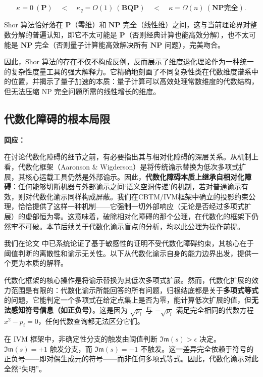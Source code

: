 \documentclass{ctexart}
\begin{document}
	\[
	\kappa = 0 \ (\mathbf{P}) \quad < \quad \kappa_q = O(1) \ (\mathbf{BQP}) \quad < \quad \kappa = \Omega(n) \ (\mathbf{NP}\text{完全}).
	\]
	
	Shor 算法恰好落在 $\mathbf{P}$（零维）和 $\mathbf{NP}$ 完全（线性维）之间，这与当前理论界对整数分解的普遍认知，即它不太可能是 $\mathbf{P}$（否则经典计算也能高效分解），也不太可能是 $\mathbf{NP}$ 完全（否则量子计算能高效解决所有 $\mathbf{NP}$ 问题），完美吻合。
	
	因此，Shor 算法的存在不仅不构成反例，反而展示了维度退化理论作为一种统一的复杂性度量工具的强大解释力。它精确地刻画了不同复杂性类在代数维度谱系中的位置，并揭示了量子加速的本质：量子计算可以高效处理常数维度的代数结构，但无法压缩 NP 完全问题所需的线性增长的维度。
	
	
	\subsection{代数化障碍的根本局限}
	
	\textbf{回应：} 
	
	在讨论代数化障碍的细节之前，有必要指出其与相对化障碍的深层关系。从机制上看，代数化框架（Aaronson \& Wigderson）是将传统谕示替换为低次多项式扩展，其核心运载工具仍然是外部谕示。因此，\textbf{代数化障碍本质上继承自相对化障碍}：任何能够切断机器与外部谕示之间‘语义空洞传递’的机制，若对普通谕示有效，则对代数化谕示同样构成屏蔽。我们在CBTM/IVM框架中确立的投影约束公理，恰恰提供了这样一种机制——它强制一切外部响应（无论是否经过多项式扩展）的虚部恒为零。这意味着，破除相对化障碍的那个公理，在代数化的框架下仍然牢不可破。本节后续关于代数化谕示盲点的分析，均以此公理为操作前提。
	
	我们在论文\cite{measure2026} 中已系统论证了基于敏感性的证明不受代数化障碍约束，其核心在于阈值判断的离散性和谕示无关性。以下从代数化谕示自身的能力边界出发，提供一个更为本质的解释。
	
	代数化框架\cite{aaronson2009}的核心操作是将谕示替换为其低次多项式扩展。然而，代数化扩展的效力范围是有限的：代数化谕示所能回答的所有问题，归根结底都是关于\textbf{多项式等式}的问题，它能判定一个多项式在给定点集上是否为零，能计算低次扩展的值，但\textbf{无法感知符号信息（如正负号）}。这是因为 $\sqrt{p_i}$ 与 $-\sqrt{p_i}$ 满足完全相同的代数方程 $x^2 - p_i = 0$，任何代数查询都无法区分它们。
	
	在 IVM 框架中，非确定性分支的触发由阈值判断 $\mathfrak{Im}(s) > \epsilon$ 决定。$\mathfrak{Im}(s) = +1$ 触发分支，而 $\mathfrak{Im}(s) = -1$ 不触发。这一差异完全依赖于符号的正负号——即对偶生成元的符号——而非任何多项式等式。因此，代数化谕示对此全然``失明''。
	
\end{document}
